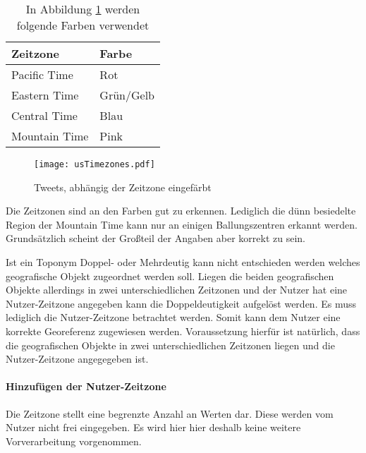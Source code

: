 					\begin{table}[h]
					\centering
					\caption{In Abbildung \ref{img:usTimezones} werden folgende Farben verwendet}
					\label{tab:timezoneColors}
						\begin{tabular}{|l|l|}
							\hline
							Zeitzone      & Farbe     \\ \hline \hline
							Pacific Time  & Rot       \\ \hline
							Eastern Time  & Grün/Gelb \\ \hline
							Central Time  & Blau      \\ \hline
							Mountain Time & Pink      \\ \hline
						\end{tabular}
					\end{table}

					 \begin{figure}[!ht]
						\begin{center}
							\texttt{[image: usTimezones.pdf]}
							\caption{Tweets, abhängig der Zeitzone eingefärbt}
							\label{img:usTimezones}
						\end{center}
					\end{figure}	

					 Die Zeitzonen sind an den Farben gut zu erkennen. 
					 Lediglich die dünn besiedelte Region der Mountain Time kann nur an einigen Ballungszentren erkannt werden. 
					 Grundsätzlich scheint der Großteil der Angaben aber korrekt zu sein.

					Ist ein Toponym Doppel- oder Mehrdeutig kann nicht entschieden werden welches geografische Objekt zugeordnet werden soll.
					Liegen die beiden geografischen Objekte allerdings in zwei unterschiedlichen Zeitzonen und der Nutzer hat eine Nutzer-Zeitzone angegeben kann die Doppeldeutigkeit aufgelöst werden.
					Es muss lediglich die Nutzer-Zeitzone betrachtet werden.
					Somit kann dem Nutzer eine korrekte Georeferenz zugewiesen werden.
					Voraussetzung hierfür ist natürlich, dass die geografischen Objekte in zwei unterschiedlichen Zeitzonen liegen und die Nutzer-Zeitzone angegegeben ist.

				\paragraph{Hinzufügen der Nutzer-Zeitzone}

					Die Zeitzone stellt eine begrenzte Anzahl an Werten dar.
					Diese werden vom Nutzer nicht frei eingegeben. 
					Es wird hier hier deshalb keine weitere Vorverarbeitung vorgenommen.

